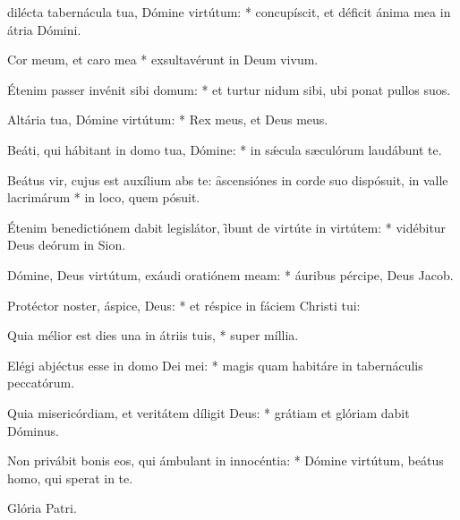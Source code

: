 \begin{psalmus}

     dilécta tabernácula tua, Dómine virtútum: * concupíscit, et déficit ánima mea in átria Dómini.

		Cor meum, et caro mea * exsultavérunt in Deum vivum.

		Étenim passer invénit sibi domum: * et turtur nidum sibi, ubi ponat pullos suos.

		Altária tua, Dómine virtútum: * Rex meus, et Deus meus.

		Beáti, qui hábitant in domo tua, Dómine: * in sǽcula sæculórum laudábunt te.

		Beátus vir, cujus est auxílium abs te: \f ascensiónes in corde suo dispósuit, in valle lacrimárum * in loco, quem pósuit.

		Étenim benedictiónem dabit legislátor, \f ibunt de virtúte in virtútem: * vidébitur Deus deórum in Sion.

		Dómine, Deus virtútum, exáudi oratiónem meam: * áuribus pércipe, Deus Jacob.

		Protéctor noster, áspice, Deus: * et réspice in fáciem Christi tui:

		Quia mélior est dies una in átriis tuis, * super míllia.

		Elégi abjéctus esse in domo Dei mei: * magis quam habitáre in tabernáculis peccatórum.

		Quia misericórdiam, et veritátem díligit Deus: * grátiam et glóriam dabit Dóminus.

		Non privábit bonis eos, qui ámbulant in innocéntia: * Dómine virtútum, beátus homo, qui sperat in te.

		Glória Patri.

\end{psalmus}
